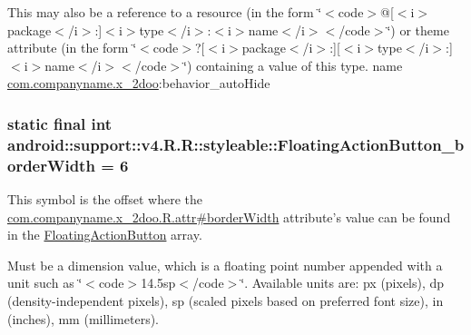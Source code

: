 This may also be a reference to a resource (in the form \char`\"{}$<$code$>$@\mbox{[}$<$i$>$package$<$/i$>$:\mbox{]}$<$i$>$type$<$/i$>$:$<$i$>$name$<$/i$>$$<$/code$>$\char`\"{}) or theme attribute (in the form \char`\"{}$<$code$>$?\mbox{[}$<$i$>$package$<$/i$>$:\mbox{]}\mbox{[}$<$i$>$type$<$/i$>$:\mbox{]}$<$i$>$name$<$/i$>$$<$/code$>$\char`\"{}) containing a value of this type.  name \hyperlink{namespacecom_1_1companyname_1_1x__2doo}{com.companyname.x\_\-2doo}:behavior\_\-autoHide \hypertarget{classandroid_1_1support_1_1v4_1_1_r_1_1styleable_b0ddfe0b4c79c8941063e2650af4a9e3}{
\subsubsection[{FloatingActionButton\_\-borderWidth}]{\setlength{\rightskip}{0pt plus 5cm}static final int android::support::v4.R.R::styleable::FloatingActionButton\_\-borderWidth = 6}}
\label{classandroid_1_1support_1_1v4_1_1_r_1_1styleable_b0ddfe0b4c79c8941063e2650af4a9e3}


This symbol is the offset where the \hyperlink{classcom_1_1companyname_1_1x__2doo_1_1_r_1_1attr_66376b83d12af2c50f72ee1e4d3a793e}{com.companyname.x\_\-2doo.R.attr\#borderWidth} attribute's value can be found in the \hyperlink{classandroid_1_1support_1_1v4_1_1_r_1_1styleable_51a0276d7190a1195d58170b1623ab3c}{FloatingActionButton} array.

Must be a dimension value, which is a floating point number appended with a unit such as \char`\"{}$<$code$>$14.5sp$<$/code$>$\char`\"{}. Available units are: px (pixels), dp (density-independent pixels), sp (scaled pixels based on preferred font size), in (inches), mm (millimeters). 

